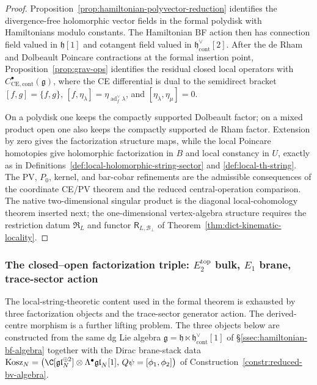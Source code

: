 \documentclass[11pt]{memoir}
\begin{document}
\begin{proof}
  Proposition~\ref{prop:hamiltonian-polyvector-reduction} identifies the
  divergence-free holomorphic vector fields in the formal polydisk with
  Hamiltonians modulo constants.  The Hamiltonian BF action then has
  connection field valued in \(\mathfrak h[1]\) and cotangent field valued
  in \(\mathfrak h^\vee_{\mathrm{cont}}[2]\).  After the de Rham and
  Dolbeault Poincare contractions at the formal insertion point,
  Proposition~\ref{prop:grav-ops} identifies the residual closed local
  operators with
  \(C^\bullet_{\mathrm{CE},\mathrm{cont}}(\mathfrak g)\), where the CE
  differential is dual to the semidirect bracket
  \([f,g]=\{f,g\}\), \([f,\eta_\lambda]
  =\eta_{\operatorname{ad}^{\vee}_f\lambda}\), and
  \([\eta_\lambda,\eta_\mu]=0\).

  On a polydisk one keeps the compactly supported Dolbeault
  factor; on a mixed product open one also keeps the compactly supported
  de Rham factor.  Extension by zero gives the factorization structure
  maps, while the local Poincare homotopies give holomorphic
  factorization in \(B\) and local constancy in \(U\), exactly as in
  Definitions~\ref{def:local-holomorphic-string-sector} and
  \ref{def:local-th-string}.  The PV, \(P_0\), kernel, and bar-cobar
  refinements are the admissible consequences of the coordinate CE/PV theorem
  and the reduced central-operation comparison.  The native
  two-dimensional singular product is the diagonal local-cohomology theorem inserted
  next; the one-dimensional vertex-algebra structure requires the
  restriction datum \(\mathfrak R_L\) and functor
  \(\mathsf R_{L,\mathcal B_\perp}\) of
  Theorem~\ref{thm:dict-kinematic-locality}.
\end{proof}



\subsubsection{The closed--open factorization triple: \texorpdfstring{\(E_2^{\mathrm{top}}\)}{E2top} bulk, \texorpdfstring{\(E_1\)}{E1} brane, trace-sector action}\label{sssec:mixed-ht-factorization-triple}

The local-string-theoretic content used in the formal theorem is
exhausted by three factorization objects and the trace-sector generator
action.  The derived-centre morphism is a further lifting problem.  The
three objects below are constructed from the same dg Lie algebra
\(\mathfrak g=\mathfrak h\ltimes\mathfrak h^\vee_{\mathrm{cont}}[1]\)
of \S\ref{ssec:hamiltonian-bf-algebra} together with the Dirac
brane-stack data
\(\mathrm{Kosz}_N=\bigl(\C[\mathfrak{gl}_N^{\oplus 2}]\otimes
 \Lambda^\bullet\mathfrak{gl}_N[1],\,Q\psi=[\phi_1,\phi_2]\bigr)\)
of Construction~\ref{constr:reduced-bv-algebra}.
\end{document}
